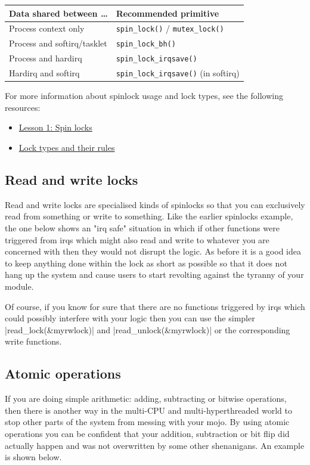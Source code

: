 \documentclass[10pt, oneside]{book}
\begin{document}
\begin{center}
\begin{tabular}{ll}
\hline
Data shared between \dots & Recommended primitive \\
\hline
Process context only               & \texttt{spin\_lock()} / \texttt{mutex\_lock()} \\
Process and softirq/tasklet        & \texttt{spin\_lock\_bh()} \\
Process and hardirq                & \texttt{spin\_lock\_irqsave()} \\
Hardirq and softirq                & \texttt{spin\_lock\_irqsave()} (in softirq) \\
\hline
\end{tabular}
\end{center}

For more information about spinlock usage and lock types, see the following resources:
\begin{itemize}
  \item \href{https://www.kernel.org/doc/Documentation/locking/spinlocks.txt}{Lesson 1: Spin locks}
  \item \href{https://docs.kernel.org/locking/locktypes.html}{Lock types and their rules}
\end{itemize}

\subsection{Read and write locks}
\label{sec:rwlock}
Read and write locks are specialised kinds of spinlocks so that you can exclusively read from something or write to something.
Like the earlier spinlocks example, the one below shows an "irq safe" situation in which if other functions were triggered from irqs which might also read and write to whatever you are concerned with then they would not disrupt the logic.
As before it is a good idea to keep anything done within the lock as short as possible so that it does not hang up the system and cause users to start revolting against the tyranny of your module.


Of course, if you know for sure that there are no functions triggered by irqs which could possibly interfere with your logic then you can use the simpler \cpp|read_lock(&myrwlock)| and \cpp|read_unlock(&myrwlock)| or the corresponding write functions.
\subsection{Atomic operations}
\label{sec:atomics}
If you are doing simple arithmetic: adding, subtracting or bitwise operations, then there is another way in the multi-CPU and multi-hyperthreaded world to stop other parts of the system from messing with your mojo.
By using atomic operations you can be confident that your addition, subtraction or bit flip did actually happen and was not overwritten by some other shenanigans.
An example is shown below.
\end{document}
